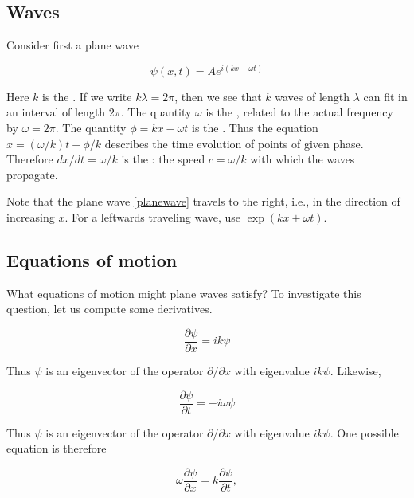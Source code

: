 \subsection{Waves}

Consider first a plane wave

\begin{equation}
\label{planewave}
\psi(x,t) = Ae^{i(kx - \omega t)}
\end{equation}

Here $k$ is the .  If we write $k\lambda= 2\pi$, then we see that $k$ waves of length $\lambda$ can fit in an interval of length $2\pi$.
The quantity $\omega$ is the , related to the actual frequency by $\omega = 2\pi$.  The quantity $\phi = kx - \omega t$  is the .   Thus the equation $x = (\omega/k)t + \phi/k$ describes the time evolution of points of given phase.  Therefore $dx/dt = \omega/k$ is the : the speed $c = \omega/k$ with which the waves propagate. 

Note that the plane wave \eqref{planewave}  travels to the right, i.e., in the direction of increasing $x$.  For a leftwards traveling wave, use $\exp(kx + \omega t)$.

\subsection{Equations of motion}

What equations of motion might plane waves satisfy?  To investigate this question, let us compute some derivatives.


\begin{equation}
\label{psix}
\frac{\partial\psi}{\partial x} = ik\psi
\end{equation}

Thus $\psi$ is an eigenvector of the operator $\partial/\partial x$ with eigenvalue $ik\psi$.  Likewise,



\begin{equation}
\frac{\partial\psi}{\partial t} = -i\omega\psi
\end{equation}

Thus $\psi$ is an eigenvector of the operator $\partial/\partial x$ with eigenvalue $ik\psi$. One possible equation is therefore

\begin{equation}
\omega \frac{\partial\psi}{\partial x} = k \frac{\partial\psi}{\partial t} ,
\end{equation}


